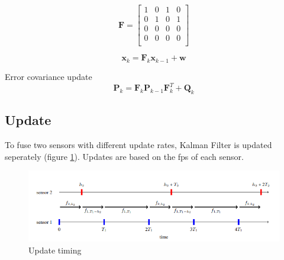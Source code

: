 \begin{equation}\label{equ:transition_matrix_H}
    \mathbf{F} = 
    \begin{bmatrix}
        1 & 0 & 1 & 0 \\
        0 & 1 & 0 & 1 \\
        0 & 0 & 0 & 0 \\
        0 & 0 & 0 & 0 \\
      \end{bmatrix}
\end{equation}

\begin{equation}\label{equ:predict_eq}
    \mathbf{x}_k=\mathbf{F}_k\mathbf{x}_{k-1}+\mathbf{w}
\end{equation}

Error covariance update
\begin{equation}\label{equ:error_covariance}
    \mathbf{P}_k=\mathbf{F}_k \mathbf{P}_{k-1} \mathbf{F}_k^T+\mathbf{Q}_k
\end{equation}

\subsection{Update}\label{equ:2_update}
To fuse two sensors with different update rates, Kalman Filter is updated seperately (figure \ref{fig:sync_fig}).
Updates are based on the fps of each sensor.
\begin{figure}[hpbt]
    \centering
    \includegraphics[width=\textwidth]{Figures/sync.png}%
    \caption{Update timing \cite{7472511}}
    \label{fig:sync_fig}
\end{figure}

